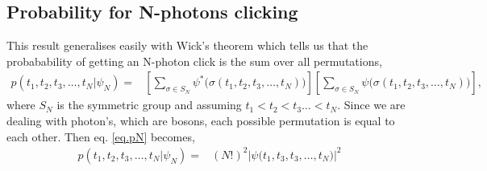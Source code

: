 \documentclass[aps,pra,twocolumn,amsmath,amssymb,color,superscriptaddress]{revtex4}
\begin{document}
\subsection{Probability for N-photons clicking}
This result generalises easily with Wick's theorem \cite{bib:wrcx1950evaluation} which tells us that the probabability of getting an N-photon click is the sum over all permutations,
\begin{align} \label{eq.pN}
p(t_1,t_2,t_3, \ldots, t_N|\psi_N)
=&  \left[  \sum_{\sigma\in S_N} \psi^*\big(\sigma(t_1,t_2,t_3,\ldots, t_N) \big)  \right] \left[  \sum_{\sigma\in S_N} \psi\big (\sigma(t_1,t_2,t_3,\ldots, t_N) \big)  \right],
\end{align}
where $S_N$ is the symmetric group and assuming $t_1<t_2<t_3\ldots <t_N$. Since we are dealing with photon's, which are bosons, each possible permutation is equal to each other. Then eq. \ref{eq.pN} becomes,
\begin{align}
p(t_1,t_2,t_3, \ldots, t_N|\psi_N)
=& (N!)^2   |\psi\big(t_1,t_3,t_3,\ldots, t_N \big)|^2
\end{align}
\end{document}
